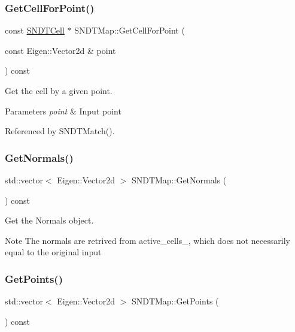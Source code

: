 \subsubsection{\texorpdfstring{Get\+Cell\+For\+Point()}{GetCellForPoint()}}
{\footnotesize\ttfamily const \hyperlink{classSNDTCell}{S\+N\+D\+T\+Cell} $\ast$ S\+N\+D\+T\+Map\+::\+Get\+Cell\+For\+Point (\begin{DoxyParamCaption}\item[{const Eigen\+::\+Vector2d \&}]{point }\end{DoxyParamCaption}) const}



Get the cell by a given point. 


\begin{DoxyParams}{Parameters}
{\em point} & Input point \\
\hline
\end{DoxyParams}


Referenced by S\+N\+D\+T\+Match().

\mbox{\label{classSNDTMap_a7a2dea761cc5767e9c216b4dc9170cec}} 
\subsubsection{\texorpdfstring{Get\+Normals()}{GetNormals()}}
{\footnotesize\ttfamily std\+::vector$<$ Eigen\+::\+Vector2d $>$ S\+N\+D\+T\+Map\+::\+Get\+Normals (\begin{DoxyParamCaption}{ }\end{DoxyParamCaption}) const}



Get the Normals object. 

\begin{DoxyNote}{Note}
The normals are retrived from active\+\_\+cells\+\_\+, which does not necessarily equal to the original input 
\end{DoxyNote}
\mbox{\label{classSNDTMap_acbbeb724448c6284121490a2ab302985}} 
\subsubsection{\texorpdfstring{Get\+Points()}{GetPoints()}}
{\footnotesize\ttfamily std\+::vector$<$ Eigen\+::\+Vector2d $>$ S\+N\+D\+T\+Map\+::\+Get\+Points (\begin{DoxyParamCaption}{ }\end{DoxyParamCaption}) const}



